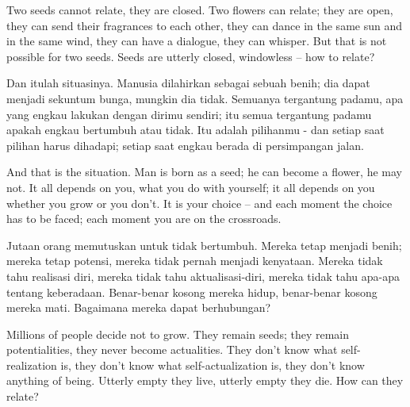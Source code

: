 \english
Two seeds cannot relate, they are closed. Two flowers can relate; they are open, they can send their fragrances to each other, they can dance in the same sun and in the same wind, they can have a dialogue, they can whisper. But that is not possible for two seeds. Seeds are utterly closed, windowless -- how to relate?

\bahasa
Dan itulah situasinya. Manusia dilahirkan sebagai sebuah benih; dia dapat menjadi sekuntum bunga, mungkin dia tidak. Semuanya tergantung padamu, apa yang engkau lakukan dengan dirimu sendiri; itu semua tergantung padamu apakah engkau bertumbuh atau tidak. Itu adalah pilihanmu - dan setiap saat pilihan harus dihadapi; setiap saat engkau berada di persimpangan jalan.

\english
And that is the situation. Man is born as a seed; he can become a flower, he may not. It all depends on you, what you do with yourself; it all depends on you whether you grow or you don't. It is your choice -- and each moment the choice has to be faced; each moment you are on the crossroads.

\bahasa
Jutaan orang memutuskan untuk tidak bertumbuh. Mereka tetap menjadi benih; mereka tetap potensi, mereka tidak pernah menjadi kenyataan. Mereka tidak tahu realisasi diri, mereka tidak tahu aktualisasi-diri, mereka tidak tahu apa-apa tentang keberadaan. Benar-benar kosong mereka hidup, benar-benar kosong mereka mati. Bagaimana mereka dapat berhubungan?

\english
Millions of people decide not to grow. They remain seeds; they remain potentialities, they never become actualities. They don't know what self-realization is, they don't know what self-actualization is, they don't know anything of being. Utterly empty they live, utterly empty they die. How can they relate?

\bahasa




